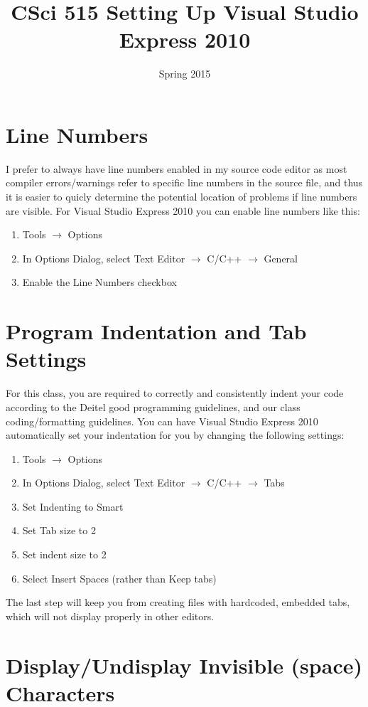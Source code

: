 \documentclass[11pt]{article}
\title{CSci 515 Setting Up Visual Studio Express 2010}
\author{}
\date{Spring 2015}
\begin{document}
\maketitle


\section{Line Numbers}
\label{sec-1}


I prefer to always have line numbers enabled in my source code editor
as most compiler errors/warnings refer to specific line numbers in the
source file, and thus it is easier to quicly determine the potential
location of problems if line numbers are visible.  For Visual Studio
Express 2010 you can enable line numbers like this:

\begin{enumerate}
\item Tools $\rightarrow$ Options
\item In Options Dialog, select Text Editor $\rightarrow$ C/C++ $\rightarrow$ General
\item Enable the Line Numbers checkbox
\end{enumerate}
\section{Program Indentation and Tab Settings}
\label{sec-2}

For this class, you are required to correctly and consistently indent your code according to the
Deitel good programming guidelines, and our class coding/formatting guidelines.  You can have
Visual Studio Express 2010 automatically set your indentation for you by changing the following
settings:

\begin{enumerate}
\item Tools $\rightarrow$ Options
\item In Options Dialog, select Text Editor $\rightarrow$ C/C++ $\rightarrow$ Tabs
\item Set Indenting to Smart
\item Set Tab size to 2
\item Set indent size to 2
\item Select Insert Spaces (rather than Keep tabs)
\end{enumerate}

The last step will keep you from creating files with hardcoded,
embedded tabs, which will not display properly in other editors.
\section{Display/Undisplay Invisible (space) Characters}
\label{sec-3}
\end{document}
